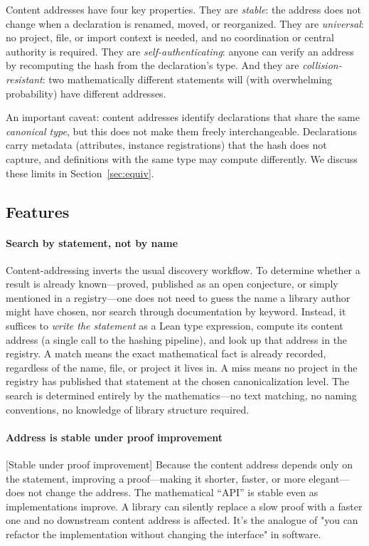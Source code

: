Content addresses have four key properties.  They are \emph{stable}:
the address does not change when a declaration is renamed, moved, or
reorganized.  They are \emph{universal}: no project, file, or import
context is needed, and no coordination or central authority is required.
They are \emph{self-authenticating}: anyone can verify an address by
recomputing the hash from the declaration's type.  And they are
\emph{collision-resistant}: two mathematically different statements will
(with overwhelming probability) have different addresses.

An important caveat: content addresses identify declarations that share
the same \emph{canonical type}, but this does not make them freely
interchangeable.  Declarations carry metadata (attributes, instance
registrations) that the hash does not capture, and definitions with the
same type may compute differently.  We discuss these limits in
Section~\ref{sec:equiv}.

\subsection{Features}

  \paragraph{Search by statement, not by name}
  \label{rem:search}
  Content-addressing inverts the usual discovery workflow.  To determine
  whether a result is already known---proved, published as an open
  conjecture, or simply mentioned in a registry---one does not need to
  guess the name a library author might have chosen, nor search through
  documentation by keyword.  Instead, it suffices to \emph{write the
  statement} as a Lean type expression, compute its content address
  (a single call to the hashing pipeline), and look up that address
  in the registry.  A match means the exact mathematical fact is already
  recorded, regardless of the name, file, or project it lives in.
  A miss means no project in the registry has published that statement
  at the chosen canonicalization level.  The search is determined
  entirely by the mathematics---no text matching, no naming conventions,
  no knowledge of library structure required.

  \paragraph{Address is stable under proof improvement}
  [Stable under proof improvement]
  \label{rem:proof-improvement}
  Because the content address depends only on the statement, improving a
  proof---making it shorter, faster, or more elegant---does not change
  the address.  The mathematical ``API'' is stable even as
  implementations improve.  A library can silently replace a slow proof
  with a faster one and no downstream content address is affected.
  It's the analogue of "you can refactor the implementation without changing the interface" in software.

